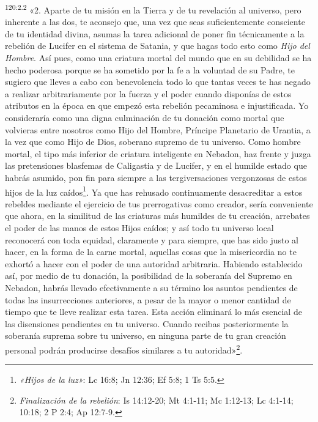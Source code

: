 \par 
\textsuperscript{120:2.2} «2. Aparte de tu misión en la Tierra y de tu revelación al universo, pero inherente a las dos, te aconsejo que, una vez que seas suficientemente consciente de tu identidad divina, asumas la tarea adicional de poner fin técnicamente a la rebelión de Lucifer en el sistema de Satania, y que hagas todo esto como \textit{Hijo del Hombre}. Así pues, como una criatura mortal del mundo que en su debilidad se ha hecho poderosa porque se ha sometido por la fe a la voluntad de su Padre, te sugiero que lleves a cabo con benevolencia todo lo que tantas veces te has negado a realizar arbitrariamente por la fuerza y el poder cuando disponías de estos atributos en la época en que empezó esta rebelión pecaminosa e injustificada. Yo consideraría como una digna culminación de tu donación como mortal que volvieras entre nosotros como Hijo del Hombre, Príncipe Planetario de Urantia, a la vez que como Hijo de Dios, soberano supremo de tu universo. Como hombre mortal, el tipo más inferior de criatura inteligente en Nebadon, haz frente y juzga las pretensiones blasfemas de Caligastia y de Lucifer, y en el humilde estado que habrás asumido, pon fin para siempre a las tergiversaciones vergonzosas de estos hijos de la luz caídos\footnote{\textit{«Hijos de la luz»}: Lc 16:8; Jn 12:36; Ef 5:8; 1 Ts 5:5.}. Ya que has rehusado continuamente desacreditar a estos rebeldes mediante el ejercicio de tus prerrogativas como creador, sería conveniente que ahora, en la similitud de las criaturas más humildes de tu creación, arrebates el poder de las manos de estos Hijos caídos; y así todo tu universo local reconocerá con toda equidad, claramente y para siempre, que has sido justo al hacer, en la forma de la carne mortal, aquellas cosas que la misericordia no te exhortó a hacer con el poder de una autoridad arbitraria. Habiendo establecido así, por medio de tu donación, la posibilidad de la soberanía del Supremo en Nebadon, habrás llevado efectivamente a su término los asuntos pendientes de todas las insurrecciones anteriores, a pesar de la mayor o menor cantidad de tiempo que te lleve realizar esta tarea. Esta acción eliminará lo más esencial de las disensiones pendientes en tu universo. Cuando recibas posteriormente la soberanía suprema sobre tu universo, en ninguna parte de tu gran creación personal podrán producirse desafíos similares a tu autoridad»\footnote{\textit{Finalización de la rebelión}: Is 14:12-20; Mt 4:1-11; Mc 1:12-13; Lc 4:1-14; 10:18; 2 P 2:4; Ap 12:7-9.}.

